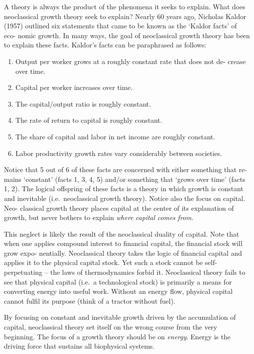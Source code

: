 \documentclass[
]{book}
\begin{document}
A theory is always the product of the phenomena it seeks to explain. What does
neoclassical growth theory seek to explain? Nearly 60 years ago, Nicholas Kaldor
(1957) outlined six statements that came to be known as the `Kaldor facts' of eco-
nomic growth. In many ways, the goal of neoclassical growth theory has been to
explain these facts. Kaldor's facts can be paraphrased as follows:

\begin{enumerate}
\def\labelenumi{\arabic{enumi}.}
\item
  Output per worker grows at a roughly constant rate that does not de-
  crease over time.
\item
  Capital per worker increases over time.
\item
  The capital/output ratio is roughly constant.
\item
  The rate of return to capital is roughly constant.
\item
  The share of capital and labor in net income are roughly constant.
\item
  Labor productivity growth rates vary considerably between societies.
\end{enumerate}

Notice that 5 out of 6 of these facts are concerned with either something that re-
mains `constant' (facts 1, 3, 4, 5) and/or something that `grows over time' (facts 1,
2). The logical offspring of these facts is a theory in which growth is constant and
inevitable (i.e.~neoclassical growth theory). Notice also the focus on capital. Neo-
classical growth theory places capital at the center of its explanation of growth, but
never bothers to explain \emph{where capital comes from.}

This neglect is likely the result
of the neoclassical duality of capital. Note that when one
applies compound interest to financial capital, the financial stock will grow expo-
nentially. Neoclassical theory takes the logic of financial capital and applies it to the
physical capital stock. Yet such a stock cannot be self-perpetuating -- the laws of
thermodynamics forbid it. Neoclassical theory fails to see that physical capital
(i.e.~a technological stock) is primarily a means for converting energy
into useful work. Without an energy flow, physical capital cannot fulfil its purpose
(think of a tractor without fuel).

By focusing on constant and inevitable growth driven by the accumulation of
capital, neoclassical theory set itself on the wrong course from the very beginning.
The focus of a growth theory should be on \emph{energy}. Energy is the driving force that
sustains all biophysical systems.
\end{document}
